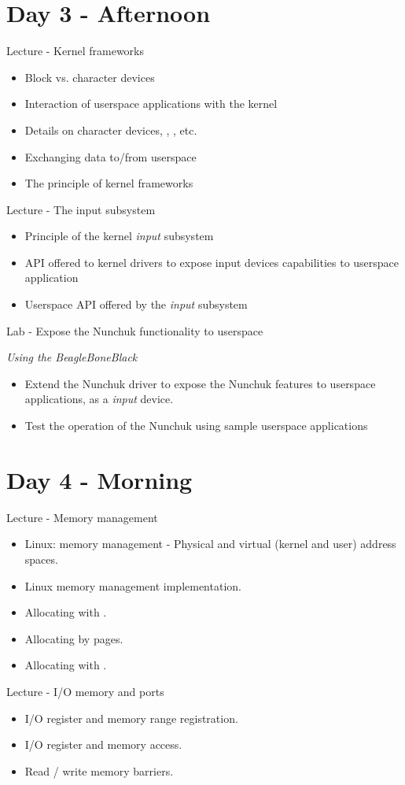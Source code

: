 \documentclass[a4paper,12pt,obeyspaces,spaces,hyphens]{article}
\begin{document}
\section{Day 3 - Afternoon}

\feagendaonecolumn
{Lecture - Kernel frameworks}
{
  \begin{itemize}
  \item Block vs. character devices
  \item Interaction of userspace applications with the kernel
  \item Details on character devices, , , etc.
  \item Exchanging data to/from userspace
  \item The principle of kernel frameworks
  \end{itemize}
}

\feagendatwocolumn
{Lecture - The input subsystem}
{
  \begin{itemize}
  \item Principle of the kernel {\em input} subsystem
  \item API offered to kernel drivers to expose input devices
    capabilities to userspace application
  \item Userspace API offered by the {\em input} subsystem
  \end{itemize}
}
{Lab - Expose the Nunchuk functionality to userspace}
{
  {\em Using the BeagleBoneBlack}
  \begin{itemize}
  \item Extend the Nunchuk driver to expose the Nunchuk features to
    userspace applications, as a {\em input} device.
  \item Test the operation of the Nunchuk using sample userspace
    applications
  \end{itemize}
}

\section{Day 4 - Morning}

\feagendatwocolumn
{Lecture - Memory management}
{
  \begin{itemize}
  \item Linux: memory management - Physical and virtual (kernel and user) address spaces.
  \item Linux memory management implementation.
  \item Allocating with .
  \item Allocating by pages.
  \item Allocating with .
  \end{itemize}
}
{Lecture - I/O memory and ports}
{
  \begin{itemize}
  \item I/O register and memory range registration.
  \item I/O register and memory access.
  \item Read / write memory barriers.
  \end{itemize}
}
\end{document}
